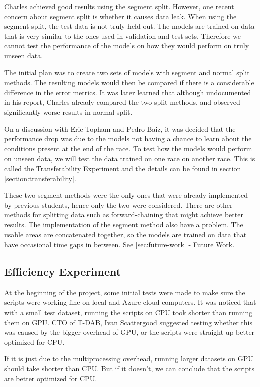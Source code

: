 \documentclass[12pt,twoside]{report}
\begin{document}
Charles achieved good results using the segment split. However, one recent concern about segment split is whether it causes data leak. When using the segment split, the test data is not truly held-out. The models are trained on data that is very similar to the ones used in validation and test sets. Therefore we cannot test the performance of the models on how they would perform on truly unseen data.

The initial plan was to create two sets of models with segment and normal split methods. The resulting models would then be compared if there is a considerable difference in the error metrics. It was later learned that although undocumented in his report, Charles already compared the two split methods, and observed significantly worse results in normal split.

On a discussion with Eric Topham and Pedro Baiz, it was decided that the performance drop was due to the models not having a chance to learn about the conditions present at the end of the race. To test how the models would perform on unseen data, we will test the data trained on one race on another race. This is called the Transferability Experiment and the details can be found in section \ref{section:transferability}.

These two segment methods were the only ones that were already implemented by previous students, hence only the two were considered. There are other methods for splitting data such as forward-chaining that might achieve better results. The implementation of the segment method also have a problem. The usable areas are concatenated together, so the models are trained on data that have occasional time gaps in between. See \ref{sec:future-work} - Future Work.


\subsection{Efficiency Experiment}
At the beginning of the project, some initial tests were made to make sure the scripts were working fine on local and Azure cloud computers. It was noticed that with a small test dataset, running the scripts on CPU took shorter than running them on GPU. CTO of T-DAB, Ivan Scattergood suggested testing whether this was caused by the bigger overhead of GPU, or the scripts were straight up better optimized for CPU.

If it is just due to the multiprocessing overhead, running larger datasets on GPU should take shorter than CPU. But if it doesn't, we can conclude that the scripts are better optimized for CPU.
\end{document}
